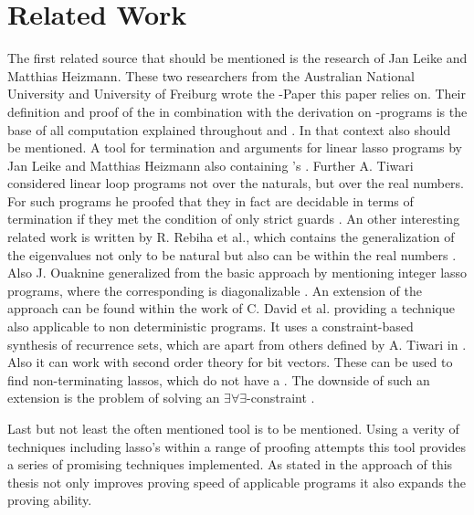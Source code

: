 \chapter{Related Work}
\label{chapter:related-work}

The first related source that should be mentioned is the research of Jan Leike and Matthias Heizmann. These two researchers from the Australian National University and University of Freiburg wrote the \gna-Paper this paper relies on. Their definition and proof of the \gna in combination with the derivation on \lasso-programs is the base of all computation explained throughout  and   \cite{leike2014geometric}. \newline
In that context also  should be mentioned. A tool for termination and \nonterm arguments for linear lasso programs by Jan Leike and Matthias Heizmann also containing \gna's  \cite{LassoRanker}.\newline
Further A. Tiwari considered linear loop programs not over the naturals, but over the real numbers. For such programs he proofed that they in fact are decidable in terms of termination if they met the condition of only strict guards \cite{tiwari2004termination}. \newline
An other interesting related work is written by R. Rebiha et al., which contains the generalization of the eigenvalues not only to be natural but also can be within the real numbers \cite{rebiha2014characterization}. Also J. Ouaknine generalized from the basic approach by mentioning integer lasso programs, where the corresponding \updatematrix is diagonalizable \cite{ouaknine2014termination}. \newline
An extension of the \gna approach can be found within the work of C. David et al. providing a technique also applicable to non deterministic programs. It uses a constraint-based synthesis of recurrence sets, which are apart from others defined by A. Tiwari in \cite{tiwari2004termination}. Also it can work with second order theory for bit vectors. These can be used to find non-terminating lassos, which do not have a \gna. The downside of such an extension is the problem of solving an $\exists\forall\exists$-constraint \cite{david2015unrestricted} \cite{leike2014geometric}.

Last but not least the often mentioned tool \aprove is to be mentioned. Using a verity of techniques including lasso's within a range of proofing attempts this tool provides a series of promising techniques implemented. 
As stated in  the approach of this thesis not only improves proving speed of applicable programs it also expands the proving ability. 
